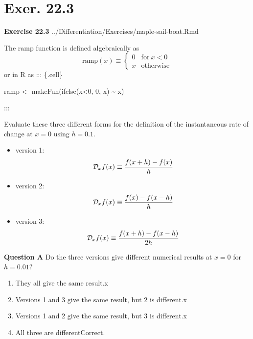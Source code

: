 \documentclass[
  letterpaper,
  DIV=11,
  numbers=noendperiod,
  oneside]{article}
\newenvironment{Shaded}{\begin{snugshade}}{\end{snugshade}}
\newcommand{\DecValTok}[1]{\textcolor[rgb]{0.68,0.00,0.00}{#1}}
\newcommand{\FunctionTok}[1]{\textcolor[rgb]{0.28,0.35,0.67}{#1}}
\newcommand{\NormalTok}[1]{\textcolor[rgb]{0.00,0.23,0.31}{#1}}
\newcommand{\OtherTok}[1]{\textcolor[rgb]{0.00,0.23,0.31}{#1}}
\newcommand{\SpecialCharTok}[1]{\textcolor[rgb]{0.37,0.37,0.37}{#1}}
\providecommand{\tightlist}{%
  \setlength{\itemsep}{0pt}\setlength{\parskip}{0pt}}\usepackage{longtable,booktabs,array}
\begin{document}
\begin{multicols}{2}
\begin{figure}
\end{figure}

\hypertarget{exer.-22.3}{%
\section*{Exer. 22.3}\label{exer.-22.3}}

\textbf{Exercise 22.3} ../Differentiation/Exercises/maple-sail-boat.Rmd

The ramp function is defined algebraically as
\[\text{ramp}(x) \equiv \left\{\begin{array}{ll}0 & \text{for}\ x < 0\\ x & \text{otherwise} \end{array}\right. \]
or in R as ::: \{.cell\}

\begin{Shaded}
\begin{Highlighting}[]
\NormalTok{ramp }\OtherTok{\textless{}{-}} \FunctionTok{makeFun}\NormalTok{(}\FunctionTok{ifelse}\NormalTok{(x}\SpecialCharTok{\textless{}}\DecValTok{0}\NormalTok{, }\DecValTok{0}\NormalTok{, x) }\SpecialCharTok{\textasciitilde{}}\NormalTok{ x)}
\end{Highlighting}
\end{Shaded}

:::

Evaluate these three different forms for the definition of the
instantaneous rate of change at \(x=0\) using \(h=0.1\).

\begin{itemize}
\tightlist
\item
  version 1: \[{\cal D}_x f(x) \equiv \frac{f(x+h) - f(x)}{h}\]
\item
  version 2: \[{\cal D}_x f(x) \equiv  \frac{f(x) - f(x-h)}{h}\]
\item
  version 3: \[{\cal D}_x f(x) \equiv  \frac{f(x+h) - f(x-h)}{2 h}\]
\end{itemize}

\textbf{Question A} Do the three versions give different numerical
results at \(x=0\) for \(h=0.01\)?

\begin{enumerate}
\def\labelenumi{\roman{enumi}.}
\tightlist
\item
  {They all give the same result.{x}}\\
\item
  {Versions 1 and 3 give the same result, but 2 is different.{x}}\\
\item
  {Versions 1 and 2 give the same result, but 3 is different.{x}}\\
\item
  {All three are different{Correct.~}}
\end{enumerate}


\end{multicols}
\end{document}
